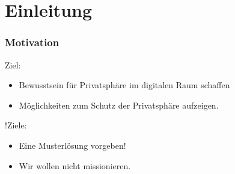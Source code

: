 \section{Einleitung}

\begin{frame}
  \frametitle{Motivation}

  Ziel:
  \begin{itemize}
   \item Bewusstsein für Privatsphäre im digitalen Raum schaffen
   \item Möglichkeiten zum Schutz der Privatsphäre aufzeigen.
  \end{itemize}

  \vspace{2ex}

  !Ziele:
  \begin{itemize}
    \item Eine Musterlösung vorgeben!
    \item Wir wollen nicht missionieren.
  \end{itemize}
\end{frame}

